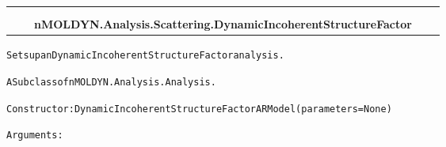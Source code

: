     \label{nMOLDYN:Analysis:Scattering:DynamicIncoherentStructureFactor}
\begin{tabular}{cccccc}
\multicolumn{2}{r}{\settowidth{\BCL}{nMOLDYN.Analysis.Analysis.Analysis}\multirow{2}{\BCL}{nMOLDYN.Analysis.Analysis.Analysis}}
&&
  \\\cline{3-3}
  &&\multicolumn{1}{c|}{}
&&
  \\
&&\multicolumn{2}{l}{\textbf{nMOLDYN.Analysis.Scattering.DynamicIncoherentStructureFactor}}
\end{tabular}

\begin{alltt}
Sets up an Dynamic Incoherent Structure Factor analysis.

A Subclass of nMOLDYN.Analysis.Analysis. 

Constructor: DynamicIncoherentStructureFactorARModel({\textbar}parameters{\textbar} = None)

Arguments:


\end{alltt}
